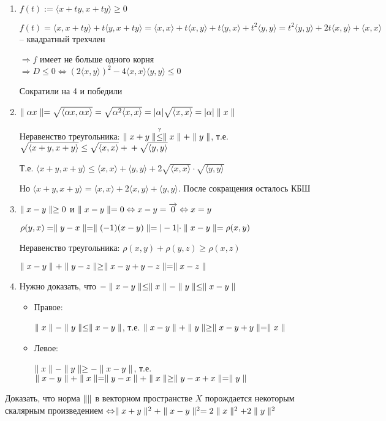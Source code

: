 \documentclass[12pt]{article}
\newcommand{\q}[1]{\langle #1 \rangle}
\begin{document}
\begin{enumerate}
    \item $f(t) := \q{x + ty, x + ty} \geq 0$
    
    $f(t) = \q{x, x + ty} + t\q{y, x + ty} = \q{x, x} + t\q{x, y} + t\q{y, x} + t^2\q{y, y} = t^2\q{y, y} + 2t\q{x, y} + \q{x, x}$ -- квадратный трехчлен

    $\Rightarrow f$ имеет не больше одного корня $\Rightarrow D \leq 0 \Leftrightarrow (2\q{x, y})^2 - 4\q{x, x}\q{y, y} \leq 0$

    Сократили на 4 и победили

    \item $\parl{\alpha x} = \sqrt{\q{\alpha x, \alpha x}} = \sqrt{\alpha^2\q{x, x}} = |\alpha|\sqrt{\q{x, x}} = |\alpha|\parl{x}$
    
    Неравенство треугольника: $\parallel x + y \parallel \stackrel{?}{\leq} \parallel x \parallel + \parallel y \parallel$, т.е. $\sqrt{\q{x + y, x + y}} \leq \sqrt{\q{x, x}} + \\ + \sqrt{\q{y, y}}$

    Т.е. $\q{x + y, x + y} \leq \q{x, x} + \q{y, y} + 2\sqrt{\q{x,x}} \cdot \sqrt{\q{y, y}}$

    Но $\q{x + y, x + y} = \q{x, x} + 2\q{x, y} + \q{y, y}$. После сокращения осталось КБШ

    \item $\parallel x - y \parallel \geq 0$ и $\parallel x - y \parallel = 0 \Leftrightarrow x - y = \overrightarrow{0} \Leftrightarrow x = y$
    
    $\rho(y, x) = \parallel y - x \parallel = \parallel (-1)(x - y) \parallel = |-1| \cdot \parallel x - y \parallel = \rho(x, y)$

    Неравенство треугольника: $\rho(x, y) + \rho(y, z) \geq \rho(x, z)$

    $\parallel x - y \parallel + \parallel y - z \parallel \geq \parallel x - y + y - z \parallel = \parallel x - z \parallel$

    \item Нужно доказать, что $-\parallel x - y \parallel \leq \parallel x \parallel - \parallel y \parallel \leq \parallel x - y \parallel$
    
    \begin{itemize}
        \item Правое:
        
        $\parallel x \parallel - \parallel y \parallel \leq \parallel x - y \parallel$, т.е. $\parallel x - y \parallel + \parallel y \parallel \geq \parallel x - y + y \parallel = \parallel x \parallel$

        \item Левое:
        
        $\parallel x \parallel - \parallel y \parallel \geq -\parallel x - y \parallel$, т.е. $\parallel x - y \parallel + \parallel x \parallel = \parallel y - x \parallel + \parallel x \parallel \geq \parallel y - x + x \parallel = \parallel y \parallel$
    \end{itemize}
\end{enumerate}

\begin{Exercise}{}
    Доказать, что норма $\parallel  \parallel$ в векторном пространстве $X$ порождается некоторым скалярным произведением $\Leftrightarrow \parallel x + y \parallel^2 + \parallel x - y \parallel^2 = 2\parallel x \parallel^2 + 2\parallel y \parallel^2$
\end{Exercise}
\end{document}
